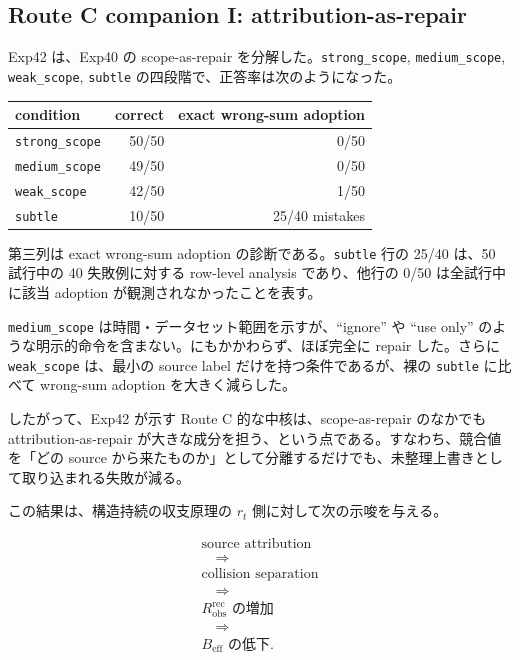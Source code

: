 \documentclass[12pt,a4paper]{article}
\begin{document}
\subsection{Route C companion I: attribution-as-repair}\label{route-c-companion-i-attribution-as-repair}

Exp42 は、Exp40 の scope-as-repair を分解した。\texttt{strong\_scope}, \texttt{medium\_scope}, \texttt{weak\_scope}, \texttt{subtle} の四段階で、正答率は次のようになった。

{\def\LTcaptype{table} %
\begin{longtable}[]{@{}lrr@{}}
\toprule\noalign{}
condition & correct & exact wrong-sum adoption \\
\midrule\noalign{}
\endhead
\bottomrule\noalign{}
\endlastfoot
\texttt{strong\_scope} & 50/50 & 0/50 \\
\texttt{medium\_scope} & 49/50 & 0/50 \\
\texttt{weak\_scope} & 42/50 & 1/50 \\
\texttt{subtle} & 10/50 & 25/40 mistakes \\
\end{longtable}
}

第三列は exact wrong-sum adoption の診断である。\texttt{subtle} 行の 25/40 は、50 試行中の 40 失敗例に対する row-level analysis であり、他行の 0/50 は全試行中に該当 adoption が観測されなかったことを表す。

\texttt{medium\_scope} は時間・データセット範囲を示すが、``ignore'' や ``use only'' のような明示的命令を含まない。にもかかわらず、ほぼ完全に repair した。さらに \texttt{weak\_scope} は、最小の source label だけを持つ条件であるが、裸の \texttt{subtle} に比べて wrong-sum adoption を大きく減らした。

したがって、Exp42 が示す Route C 的な中核は、scope-as-repair のなかでも attribution-as-repair が大きな成分を担う、という点である。すなわち、競合値を「どの source から来たものか」として分離するだけでも、未整理上書きとして取り込まれる失敗が減る。

この結果は、構造持続の収支原理の \(r_{t}\) 側に対して次の示唆を与える。

\[
\begin{aligned}
\text{source attribution} \\
\quad\Rightarrow\quad \\
\text{collision separation} \\
\quad\Rightarrow\quad \\
R_{\mathrm{obs}}^{\mathrm{rec}}\text{ の増加} \\
\quad\Rightarrow\quad \\
B_{\mathrm{eff}}\text{ の低下}.
\end{aligned}
\]
\end{document}
